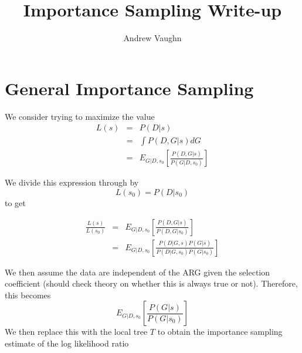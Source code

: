 \documentclass{article}
\title{Importance Sampling Write-up}
\author{Andrew Vaughn}
\date{}
\begin{document}
\maketitle

\section {General Importance Sampling}
We consider trying to maximize the value
 \begin{eqnarray}
L(s) &=&  P(D | s )  \\
&=&  \int   P(D,G|s)   dG   \\ 
 &=&    E_{G | D, s_0} \left   [\frac{P(D ,  G | s ) }{    P(G|D, s _ 0)     } \right]   
\end{eqnarray}

We divide this expression through by $$ L(s _ 0) =  P(D | s _ 0  )  $$ to get 

 \begin{eqnarray}
 \frac{  L(s)}{L(s_0)} &=&    E_{G | D, s_0} \left   [\frac{P(D ,  G| s)    }{    P(D,G| s_0)    } \right]      \\ 
  &=&       E_{G | D, s_0 } \left   [\frac{P(D |  G, s)P(G|s)   }{  P(D |  G, s_0)P(G|s_0)   } \right]    
  \end{eqnarray}

    
    We then assume the data are independent of the ARG given the selection coefficient (should check theory on whether this is always true or not). Therefore, this becomes
    $$   E_{G | D, s_0 } \left   [\frac{ P(G|s)   }{   P(G|s_0)   } \right]    $$
    We then replace this with the local tree $T$ to obtain the importance sampling estimate of the log likelihood ratio
    
\end{document}
